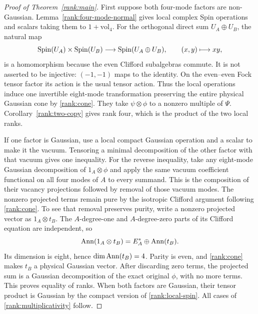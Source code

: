 \begin{proof}[Proof of Theorem~\ref{rank:main}]
First suppose both four-mode factors are non-Gaussian.
Lemma~\ref{rank:four-mode-normal} gives local complex Spin operations
and scalars taking them to $1+\mathrm{vol}_4$.
For the orthogonal direct sum $U_A\oplus U_B$, the natural map
\begin{equation}
 \operatorname{Spin}(U_A)\times\operatorname{Spin}(U_B)\longrightarrow\operatorname{Spin}(U_A\oplus U_B),
 \qquad (x,y)\longmapsto xy,
 \label{rank:local-spin}
\end{equation}
is a homomorphism because the even Clifford subalgebras commute.
It is not asserted to be injective: $(-1,-1)$ maps to the identity.
On the even--even Fock tensor factor its action is the usual tensor action.
Thus the local operations induce one invertible eight-mode transformation
preserving the entire physical Gaussian cone by \eqref{rank:cone}.
They take $\psi\otimes\phi$ to a nonzero multiple of $\Psi$.
Corollary~\ref{rank:two-copy} gives rank four, which is the product of
the two local ranks.

If one factor is Gaussian, use a local compact Gaussian operation and a
scalar to make it the vacuum. Tensoring a minimal decomposition of the
other factor with that vacuum gives one inequality. For the reverse
inequality, take any eight-mode Gaussian decomposition of
$1_A\otimes\phi$ and apply the same vacuum coefficient functional on all
four modes of $A$ to every summand. This is the composition of their
vacancy projections followed by removal of those vacuum modes.
The nonzero projected terms remain pure by the isotropic Clifford argument
following \eqref{rank:cone}. To see that removal preserves purity, write a
nonzero projected vector as $1_A\otimes t_B$. The $A$-degree-one and
$A$-degree-zero parts of its Clifford equation are independent, so
\[
 \operatorname{Ann}(1_A\otimes t_B)=E_A^*\oplus\operatorname{Ann}(t_B).
\]
Its dimension is eight, hence $\dim\operatorname{Ann}(t_B)=4$. Parity is even, and
\eqref{rank:cone} makes $t_B$ a physical Gaussian vector.
After discarding zero terms, the projected sum is a Gaussian decomposition
of the exact original $\phi$, with no more terms. This proves equality
of ranks. When both factors are Gaussian, their tensor product is Gaussian
by the compact version of \eqref{rank:local-spin}. All cases of
\eqref{rank:multiplicativity} follow.
\end{proof}

